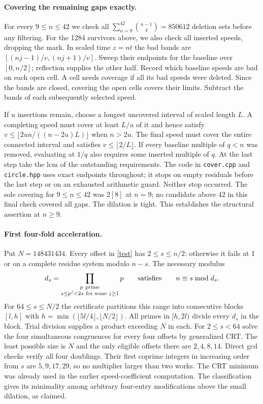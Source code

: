 \paragraph{Covering the remaining gaps exactly.}
For every $9\le n\le42$ we check all $\sum_{n=9}^{42}\binom{n-1}{4}=850612$ deletion sets before any filtering. For the 1284 survivors above, we also check all inserted speeds, dropping the mark. In scaled time $z=nt$ the bad bands are $[(nj-1)/v,(nj+1)/v]$. Sweep their endpoints for the baseline over $[0,n/2]$; reflection supplies the other half. Record which baseline speeds are bad on each open cell. A cell needs coverage if all its bad speeds were deleted. Since the bands are closed, covering the open cells covers their limits. Subtract the bands of each subsequently selected speed.

If $u$ insertions remain, choose a longest uncovered interval of scaled length $L$. A completing speed must cover at least $L/u$ of it and hence satisfy $v\le\lfloor2un/((n-2u)L)\rfloor$ when $n>2u$. The final speed must cover the entire connected interval and satisfies $v\le\lfloor2/L\rfloor$. If every baseline multiple of $q<n$ was removed, evaluating at $1/q$ also requires some inserted multiple of $q$. At the last step take the lcm of the outstanding requirements. The code in \texttt{cover.cpp} and \texttt{circle.hpp} uses exact endpoints throughout; it stops on empty residuals before the last step or on an exhausted arithmetic guard. Neither stop occurred. The sole covering for $9\le n\le42$ was $2[8]$ at $n=9$; no candidate above 42 in this final check covered all gaps. The dilation is tight. This establishes the structural assertion at $n\ge9$.

\paragraph{First four-fold acceleration.}
Put $N=148431434$. Every offset in \eqref{test} has $2\le s\le n/2$: otherwise it fails at 1 or on a complete residue system modulo $n-s$. The necessary modulus
\[
 d_s=\prod_{\substack{p\ {\rm prime}\\s\le p^j<2s\ \text{for some }j\ge1}}p
 \qquad\text{satisfies}\qquad n\equiv s\bmod d_s .
\]
For $64\le s\le N/2$ the certificate partitions this range into consecutive blocks $[l,h]$ with $h=\min(\lfloor5l/4\rfloor,\lfloor N/2\rfloor)$. All primes in $[h,2l)$ divide every $d_s$ in the block. Trial division supplies a product exceeding $N$ in each. For $2\le s<64$ solve the four simultaneous congruences for every four offsets by generalized CRT. The least possible size is $N$ and the only eligible offsets there are $2,4,8,14$. Direct gcd checks verify all four doublings. Their first coprime integers in increasing order from $s$ are $5,9,17,29$, so no multiplier larger than two works. The CRT minimum was already used in the earlier speed-coefficient computation. The classification gives its minimality among arbitrary four-entry modifications above the small dilation, as claimed.

